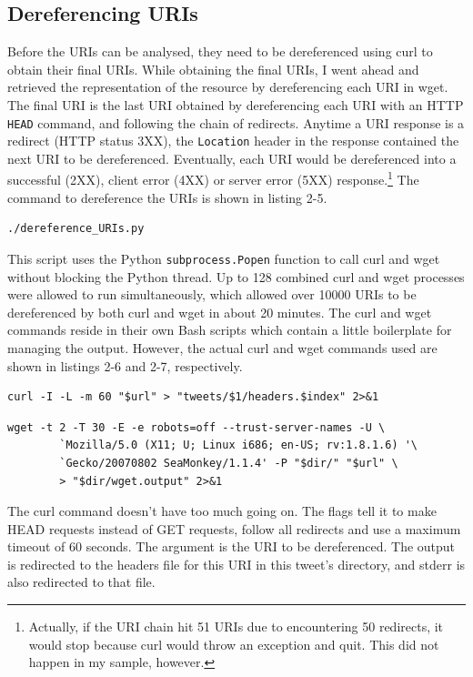\documentclass[a4paper,12pt]{article}
\begin{document}
\subsection{Dereferencing URIs}
Before the URIs can be analysed, they need to be dereferenced using curl to obtain their final URIs. While
obtaining
the final URIs, I went ahead and retrieved the representation of the resource by dereferencing each URI in
wget. The final URI is the last URI obtained by dereferencing each URI with an HTTP \texttt{HEAD} command,
and following the chain of redirects. Anytime a URI response is a redirect (HTTP status 3XX), the \texttt{Location} header
in the response contained the next URI to be dereferenced.\cite{rfc2616} Eventually, each URI would be
dereferenced into a successful (2XX), client error (4XX) or server error (5XX) response.\footnote{Actually,
if the URI chain hit 51 URIs due to encountering 50 redirects, it would stop because curl would throw an
exception and quit. This did not happen in my sample, however.} The command to dereference the URIs is shown
in listing 2-5.
\begin{lstlisting}[basicstyle=\ttfamily,caption={Dereferencing URIs}]
    ./dereference_URIs.py
\end{lstlisting}
This script uses the Python \texttt{subprocess.Popen} function to call curl and wget without blocking the
Python thread. Up to 128 combined curl and wget processes were allowed to run simultaneously, which
allowed over 10000 URIs to be dereferenced by both curl and wget in about 20 minutes. The curl and wget
commands reside in their own Bash scripts which contain a little boilerplate for managing the output.
However, the actual curl and wget commands used are shown in listings 2-6 and 2-7, respectively.
\begin{lstlisting}[basicstyle=\ttfamily,caption={Curl Command}]
    curl -I -L -m 60 "$url" > "tweets/$1/headers.$index" 2>&1
\end{lstlisting}
\begin{lstlisting}[basicstyle=\ttfamily,caption={Wget Command}]
    wget -t 2 -T 30 -E -e robots=off --trust-server-names -U \
        `Mozilla/5.0 (X11; U; Linux i686; en-US; rv:1.8.1.6) '\
        `Gecko/20070802 SeaMonkey/1.1.4' -P "$dir/" "$url" \
        > "$dir/wget.output" 2>&1
\end{lstlisting}
The curl command doesn't have too much going on. The flags tell it to make HEAD requests instead of GET
requests, follow all redirects and use a maximum timeout of 60 seconds. The argument is the URI to be
dereferenced. The output is redirected to the headers file for this URI in this tweet's directory,
and stderr is also redirected to that file.
\end{document}
